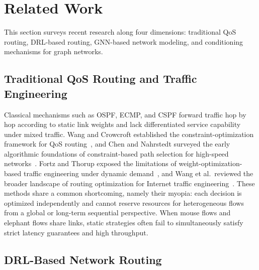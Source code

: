 \section{Related Work}
\label{sec:related}

This section surveys recent research along four dimensions: traditional QoS routing, DRL-based routing, GNN-based network modeling, and conditioning mechanisms for graph networks.

\subsection{Traditional QoS Routing and Traffic Engineering}

Classical mechanisms such as OSPF, ECMP, and CSPF forward traffic hop by hop according to static link weights and lack differentiated service capability under mixed traffic. Wang and Crowcroft established the constraint-optimization framework for QoS routing~\cite{Wang1996_QoSRouting}, and Chen and Nahrstedt surveyed the early algorithmic foundations of constraint-based path selection for high-speed networks~\cite{Chen1998_QoSRouting}. Fortz and Thorup exposed the limitations of weight-optimization-based traffic engineering under dynamic demand~\cite{Fortz2000_TrafficEngineering}, and Wang et al.\ reviewed the 
broader landscape of routing optimization for Internet traffic 
engineering~\cite{Wang2008_RoutingOptimizationSurvey}. These methods share a common shortcoming, namely their myopia: each decision is optimized independently and cannot reserve resources for heterogeneous flows from a global or long-term sequential perspective. When mouse flows and elephant flows share links, static strategies often fail to simultaneously satisfy strict latency guarantees and high throughput.

\subsection{DRL-Based Network Routing}

